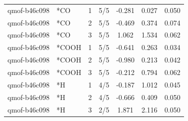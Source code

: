 \begin{table}[t]
\begin{tabular}{llccccc}
qmof-b46c098 & *CO & 1 & 5/5 & -0.281 & 0.027 & 0.050 \\
qmof-b46c098 & *CO & 2 & 5/5 & -0.469 & 0.374 & 0.074 \\
qmof-b46c098 & *CO & 3 & 5/5 & 1.062 & 1.534 & 0.062 \\
qmof-b46c098 & *COOH & 1 & 5/5 & -0.641 & 0.263 & 0.034 \\
qmof-b46c098 & *COOH & 2 & 5/5 & -0.980 & 0.213 & 0.042 \\
qmof-b46c098 & *COOH & 3 & 5/5 & -0.212 & 0.794 & 0.062 \\
qmof-b46c098 & *H & 1 & 4/5 & -0.187 & 1.012 & 0.045 \\
qmof-b46c098 & *H & 2 & 4/5 & -0.666 & 0.409 & 0.050 \\
qmof-b46c098 & *H & 3 & 2/5 & 1.871 & 2.116 & 0.050 \\
\hline\hline
\end{tabular}
\end{table}
